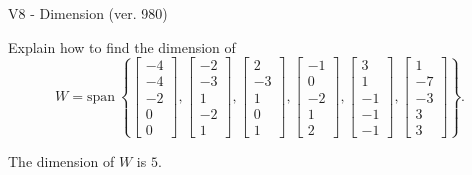 \begin{exercise}
  \begin{exerciseTitle}V8 - Dimension (ver. 980)\end{exerciseTitle}
  \begin{exerciseStatement}
    Explain how to find the dimension of 
\[W=\mathrm{span}\ \left\{\left[\begin{array}{r}
-4 \\
-4 \\
-2 \\
0 \\
0
\end{array}\right] , \left[\begin{array}{r}
-2 \\
-3 \\
1 \\
-2 \\
1
\end{array}\right] , \left[\begin{array}{r}
2 \\
-3 \\
1 \\
0 \\
1
\end{array}\right] , \left[\begin{array}{r}
-1 \\
0 \\
-2 \\
1 \\
2
\end{array}\right] , \left[\begin{array}{r}
3 \\
1 \\
-1 \\
-1 \\
-1
\end{array}\right] , \left[\begin{array}{r}
1 \\
-7 \\
-3 \\
3 \\
3
\end{array}\right]\right\}.\]



  \end{exerciseStatement}
  \begin{exerciseAnswer}
   The dimension of \(W\) is  \(5\).
  


  \end{exerciseAnswer}
\end{exercise}